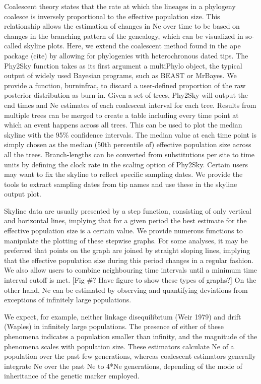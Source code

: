 \documentclass[english,titlepage]{article}
\begin{document}
Coalescent theory states that the rate at which the lineages in a phylogeny coalesce is inversely proportional to the effective population size. This relationship allows the estimation of changes in Ne over time to be based on changes in the branching pattern of the genealogy, which can be visualized in so-called skyline plots. Here, we extend the coalescent method found in the ape package (cite) by allowing for phylogenies with heterochronous dated tips.
The Phy2Sky function takes as its first argument a multiPhylo object, the typical output of widely used Bayesian programs, such as BEAST or MrBayes. We provide a function, burninfrac, to discard a user-defined proportion of the raw posterior distribution as burn-in. Given a set of trees, Phy2Sky will output the end times and Ne estimates of each coalescent interval for each tree. Results from multiple trees can be merged to create a table including every time point at which an event happens across all trees. This can be used to plot the median skyline with the 95\% confidence intervals. The median value at each time point is simply chosen as the median (50th percentile of) effective population size across all the trees. 
Branch-lengths can be converted from substitutions per site to time units by defining the clock rate in the scaling option of Phy2Sky. Certain users may want to fix the skyline to reflect specific sampling dates. We provide the tools to extract sampling dates from tip names and use these in the skyline output plot.

Skyline data are usually presented by a step function, consisting of only vertical and horizontal lines, implying that for a given period the best estimate for the effective population size is a certain value. We provide numerous functions to manipulate the plotting of these stepwise graphs. For some analyses, it may be preferred that points on the graph are joined by straight sloping lines, implying that the effective population size during this period changes in a regular fashion. We also allow users to combine neighbouring time intervals until a minimum time interval cutoff is met. [Fig \#? Have figure to show these types of graphs?] 
On the other hand, Ne can be estimated by observing and quantifying deviations from exceptions of infinitely large populations. 
  







We expect, for example, neither linkage disequilibrium (Weir 1979) and drift (Waples) in infinitely large populations. The presence of either of these phenomena indicates a population smaller than infinity, and the magnitude of the phenomena scales with population size. These estimators calculate Ne of a population over the past few generations, whereas coalescent estimators generally integrate Ne over the past Ne to 4*Ne generations, depending of the mode of inheritance of the genetic marker employed.
\end{document}
